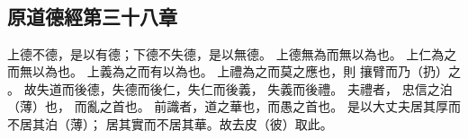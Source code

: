 ﻿%
%

\chapter{~}

\section{原道德經第三十八章}

\begin{withgezhu}

\zhsong


\colorbox{adding-color}{上德不德，是以有德；下德不失德，是以無}德。
上德無\colorbox{adding-color}{為而}無以為也。
上仁為之\colorbox{adding-color}{而無}以為也。
上義為之而有以為也。
上禮\colorbox{adding-color}{為之而莫之應也，則}
攘臂而乃（\textcolor{tongjia-color}{扔}）之
。
故失道而後德，失德而後仁，失仁而後義，
\colorbox{adding-color}{失義而後禮。}
\colorbox{adding-color}{夫禮者，}
\colorbox{adding-color}{忠信之泊（\textcolor{tongjia-color}{薄}）也}，
而亂之首也。
\colorbox{adding-color}{前識者}，道之華也，而愚之首也。
是以大丈夫居\colorbox{missing-color}{其厚而不}居其泊（\textcolor{tongjia-color}{薄}）；
居其實而不居其華。故去皮（\textcolor{tongjia-color}{彼}）取此。

\end{withgezhu}
